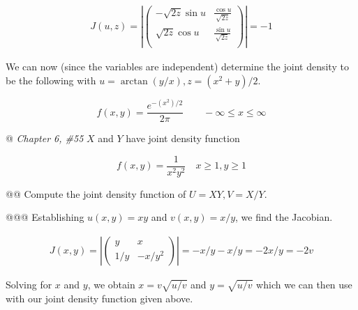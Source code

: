 \documentclass[11pt]{article}\usepackage[]{graphicx}\usepackage[]{xcolor}
\begin{document}
\begin{easylist}[enumerate]
    \begin{equation}
        \begin{aligned}
            J(u, z) = \left| \begin{pmatrix}
                                     -\sqrt{2z} \sin u & \frac{\cos u}{\sqrt{2z} }\\
                                     \sqrt{2z} \cos u & \frac{\sin u}{\sqrt{2z} }\\
                                 \end{pmatrix}
                          \right| = -1
        \end{aligned}
    \end{equation}

    We can now (since the variables are independent) determine the joint density to be the following with
    $u=\arctan\left( y/x \right), z=\left( x^2 + y \right)/2$.

    \begin{equation}
        f(x, y) = \frac{e^{-\left( x^2 \right)/2} }{2 \pi} \qquad -\infty \le x \le \infty
    \end{equation}

    @ \textit{Chapter 6, \#55} $X$ and $Y$ have joint density function

    \begin{equation}
        f(x, y) = \frac{1}{x^2y^2} \quad x \ge 1, y \ge 1
    \end{equation}

    @@ Compute the joint density function of $U = XY, V = X/Y$.

    @@@ Establishing $u(x,y)=xy$ and $v(x,y)=x/y$, we find the Jacobian.

    \begin{equation}
        \begin{aligned}
            J(x, y) = \left| \begin{pmatrix}
                                     y & x\\
                                     1/y & -x/y^2
                                 \end{pmatrix}
                          \right| = -x/y - x/y = -2x/y = -2v
        \end{aligned}
    \end{equation}

    Solving for $x$ and $y$, we obtain $x=v\sqrt{u/v}$ and $y=\sqrt{u/v}$ which we can then use with our joint density
    function given above.


\end{easylist}
\end{document}
